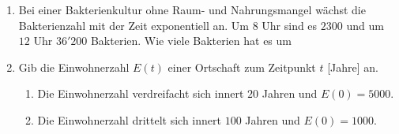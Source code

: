 \documentclass[11pt,oneside]{article}
\begin{document}
\begin{aufgabe}
\begin{enumerate}
			\item Bei einer Bakterienkultur ohne Raum- und Nahrungsmangel wächst die Bakterienzahl mit der Zeit exponentiell an. Um $8$ Uhr sind es $2300$ und um $12$ Uhr $36'200$ Bakterien. Wie viele Bakterien hat es um
			\item Gib die Einwohnerzahl $E(t)$ einer Ortschaft zum Zeitpunkt $t$ [Jahre] an.
			\begin{enumerate}[label=\alph*)]
				\item Die Einwohnerzahl verdreifacht sich innert $20$ Jahren und $E(0)=5000$.
				\item Die Einwohnerzahl drittelt sich innert $100$ Jahren und $E(0)=1000$.
			\end{enumerate}
		\end{enumerate}
	\end{aufgabe}
\end{document}
